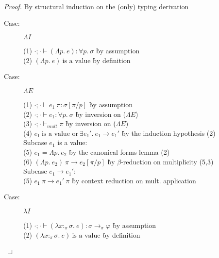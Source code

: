 
\progressthm*

\begin{proof}
By structural induction on the (only) typing derivation

\begin{description}

\item[Case:] $\Lambda I$
\begin{tabbing}
(1) $\cdot; \cdot \vdash (\Lambda p.~e) : \forall p.~\sigma$ \` by assumption \\
(2) $(\Lambda p.~e)~\textrm{is a value}$ \` by definition \\
\end{tabbing}

\item[Case:] $\Lambda E$
\begin{tabbing}
(1) $\cdot; \cdot \vdash e_1~\pi : \sigma[\pi/p]$ \` by assumption \\
(2) $\cdot; \cdot \vdash e_1 : \forall p.~\sigma$ \` by inversion on ($\Lambda E$) \\
(3) $\cdot; \cdot \vdash_{mult} \pi$ \` by inversion on ($\Lambda E$) \\
(4) $e_1~\textrm{is a value or}~\exists e_1'.~e_1 \longrightarrow e_1'$ \` by the induction hypothesis (2) \\
\textrm{Subcase $e_1$ is a value:}\\
(5) $e_1 = \Lambda p.~e_2$ \` by the canonical forms lemma (2) \\
(6) $(\Lambda p.~e_2)~\pi \longrightarrow e_2[\pi/p]$ \` by $\beta$-reduction on multiplicity (5,3) \\
\textrm{Subcase $e_1 \longrightarrow e_1'$:}\\
(5) $e_1~\pi \longrightarrow e_1'~\pi$ \` by context reduction on mult. application \\
\end{tabbing}

\item[Case:] $\lambda I$
\begin{tabbing}
(1) $\cdot; \cdot \vdash (\lambda x{:}_\pi\sigma.~e) : \sigma\to_\pi\varphi$ \` by assumption \\
(2) $(\lambda x{:}_\pi\sigma.~e)~\textrm{is a value}$ \` by definition \\
\end{tabbing}


\end{description}
\end{proof}
